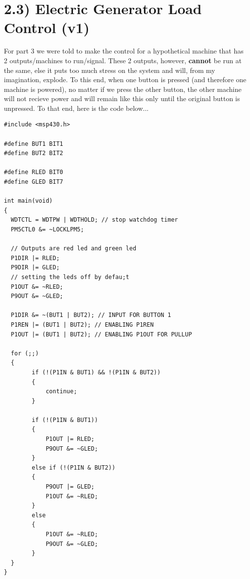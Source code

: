 \documentclass{article}
\begin{document}
\section{2.3) Electric Generator Load Control (v1)}
For part 3 we were told to make the control for a hypothetical machine that has 2 outputs/machines to run/signal. These 2 outputs, however, \textbf{cannot} be run at the same, else it puts too much stress on the system and will, from my imagination, explode. To this end, when one button is pressed (and therefore one machine is powered), no matter if we press the other button, the other machine will not recieve power and will remain like this only until the original button is unpressed. To that end, here is the code below...
\begin{lstlisting}
#include <msp430.h>

#define BUT1 BIT1
#define BUT2 BIT2

#define RLED BIT0
#define GLED BIT7

int main(void)
{
  WDTCTL = WDTPW | WDTHOLD; // stop watchdog timer
  PM5CTL0 &= ~LOCKLPM5;

  // Outputs are red led and green led
  P1DIR |= RLED;
  P9DIR |= GLED;
  // setting the leds off by defau;t
  P1OUT &= ~RLED;
  P9OUT &= ~GLED;

  P1DIR &= ~(BUT1 | BUT2); // INPUT FOR BUTTON 1
  P1REN |= (BUT1 | BUT2); // ENABLING P1REN
  P1OUT |= (BUT1 | BUT2); // ENABLING P1OUT FOR PULLUP
  
  for (;;)
  {
		if (!(P1IN & BUT1) && !(P1IN & BUT2))
		{
			continue;
		}

		if (!(P1IN & BUT1))
		{
			P1OUT |= RLED;
			P9OUT &= ~GLED;
		}
		else if (!(P1IN & BUT2))
		{
			P9OUT |= GLED;
			P1OUT &= ~RLED;
		}
		else
		{
			P1OUT &= ~RLED;
			P9OUT &= ~GLED;
		}
  }
}
\end{lstlisting}
\end{document}

